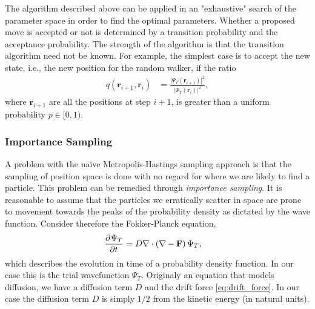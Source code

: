 \documentclass[
    a4paper, aps, twocolumn, floatfix, superscriptaddress,
    nofootinbib]{revtex4-1}
\newcommand{\vf}{\mathbf}
\newcommand{\1}{\mathds{1}}
\begin{document}
        The algorithm described above can be applied in an "exhaustive" search
        of the parameter space in order to find the optimal parameters.  Whether
        a proposed move is accepted or not is determined by a transition
        probability and the acceptance probability.  The strength of the
        algorithm is that the transition algorithm need not be known. For
        example, the simplest case is to accept the new state, i.e., the new
        position for the random walker, if the ratio
        \begin{align}
            q(\vf{r}_{i + 1}, \vf{r}_i)
            &=
            \frac{\left|\Psi_T(\vf{r}_{i + 1})\right|^2}
            {\left|\Psi_T(\vf{r}_{i})\right|^2},
        \end{align}
        where $\vf{r}_{i + 1}$ are all the positions at step $i + 1$, is greater
        than a uniform probability $p \in [0, 1)$.

        \subsubsection{Importance Sampling}
            A problem with the naïve Metropolis-Hastings sampling approach is
            that the sampling of position space is done with no regard for where
            we are likely to find a particle. This problem can be remedied
            through \emph{importance sampling}.  It is reasonable to assume that
            the particles we erratically scatter in space are prone to movement
            towards the peaks of the probability density as dictated by the wave
            function. Consider therefore the Fokker-Planck equation,
            \begin{align}
                \dpd[]{\Psi_T}{t}
                &=
                D \nabla\cdot
                \left(
                    \nabla
                    - \vf{F}
                \right) \Psi_T,
                \label{eq:fokker_planck}
            \end{align}
            which describes the evolution in time of a probability density
            function. In our case this is the trial wavefunction $\Psi_T$.
            Originaly an equation that models diffusion, we have a diffusion
            term $D$ and the drift force \autoref{eq:drift_force}. In our case
            the diffusion term $D$ is simply $1/2$ from the kinetic energy (in
            natural units).
\end{document}
